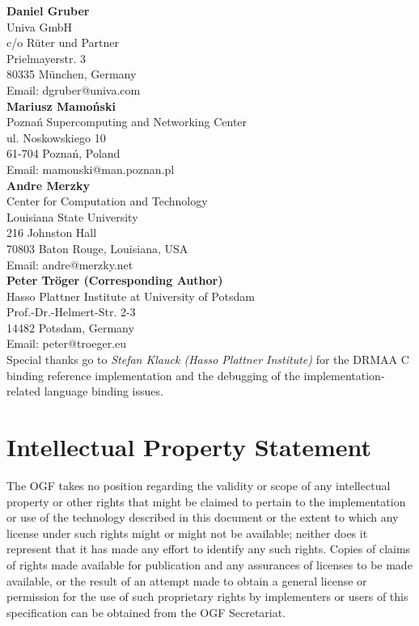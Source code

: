 \documentclass{article}
\begin{document}
\textbf{Daniel Gruber}\\
Univa GmbH\\
c/o Rüter und Partner\\
Prielmayerstr. 3\\
80335 München, Germany\\
Email: dgruber@univa.com\\

\textbf{Mariusz Mamoński}\\
Poznań Supercomputing and Networking Center\\
ul. Noskowskiego 10\\
61-704 Poznań, Poland\\
Email: mamonski@man.poznan.pl\\ 

\textbf{Andre Merzky}\\
Center for Computation and Technology\\
Louisiana State University\\
216 Johnston Hall\\
70803 Baton Rouge,  Louisiana, USA\\
Email:  andre@merzky.net\\ 

\textbf{Peter Tröger (Corresponding Author)} \\
Hasso Plattner Institute at University of Potsdam \\
Prof.-Dr.-Helmert-Str. 2-3 \\
14482 Potsdam, Germany \\
Email: peter@troeger.eu \\

Special thanks go to \emph{Stefan Klauck (Hasso Plattner Institute)} for the DRMAA C binding reference implementation and the  debugging of the implementation-related language binding issues. 


\section{Intellectual Property Statement}

 The OGF takes no position regarding the validity or scope of any
 intellectual property or other rights that might be claimed to
 pertain to the implementation or use of the technology described in
 this document or the extent to which any license under such rights
 might or might not be available; neither does it represent that it
 has made any effort to identify any such rights.  Copies of claims of
 rights made available for publication and any assurances of licenses
 to be made available, or the result of an attempt made to obtain a
 general license or permission for the use of such proprietary rights
 by implementers or users of this specification can be obtained from
 the OGF Secretariat.
\end{document}
